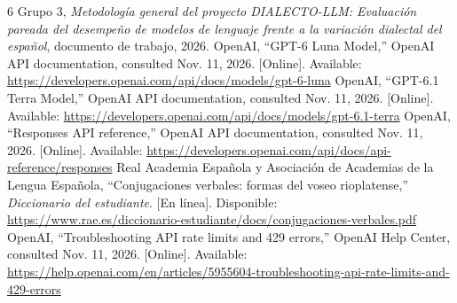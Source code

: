 \documentclass[conference]{IEEEtran}
\begin{document}
\begin{thebibliography}{6}
 Grupo 3, \emph{Metodología general del proyecto DIALECTO-LLM: Evaluación pareada del desempeño de modelos de lenguaje frente a la variación dialectal del español}, documento de trabajo, 2026.
 OpenAI, ``GPT-6 Luna Model,'' OpenAI API documentation, consulted Nov. 11, 2026. [Online]. Available: \url{https://developers.openai.com/api/docs/models/gpt-6-luna}
 OpenAI, ``GPT-6.1 Terra Model,'' OpenAI API documentation, consulted Nov. 11, 2026. [Online]. Available: \url{https://developers.openai.com/api/docs/models/gpt-6.1-terra}
 OpenAI, ``Responses API reference,'' OpenAI API documentation, consulted Nov. 11, 2026. [Online]. Available: \url{https://developers.openai.com/api/docs/api-reference/responses}
 Real Academia Española y Asociación de Academias de la Lengua Española, ``Conjugaciones verbales: formas del voseo rioplatense,'' \emph{Diccionario del estudiante}. [En línea]. Disponible: \url{https://www.rae.es/diccionario-estudiante/docs/conjugaciones-verbales.pdf}
 OpenAI, ``Troubleshooting API rate limits and 429 errors,'' OpenAI Help Center, consulted Nov. 11, 2026. [Online]. Available: \url{https://help.openai.com/en/articles/5955604-troubleshooting-api-rate-limits-and-429-errors}
\end{thebibliography}
\end{document}

